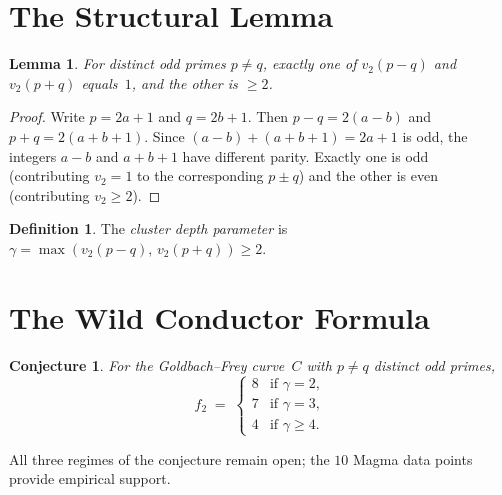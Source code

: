 \documentclass[11pt,a4paper]{article}
\newtheorem{conjecture}[theorem]{Conjecture}
\newtheorem{lemma}[theorem]{Lemma}
\theoremstyle{definition}
\newtheorem{definition}[theorem]{Definition}
\theoremstyle{remark}
\begin{document}
\section{The Structural Lemma}\label{sec:lemma}

\begin{lemma}\label{lem:structure}
  For distinct odd primes $p \ne q$, exactly one of
  $v_2(p - q)$ and $v_2(p + q)$ equals~$1$, and the
  other is $\ge 2$.
\end{lemma}

\begin{proof}
  Write $p = 2a + 1$ and $q = 2b + 1$.  Then
  $p - q = 2(a - b)$ and $p + q = 2(a + b + 1)$.
  Since $(a - b) + (a + b + 1) = 2a + 1$ is odd,
  the integers $a - b$ and $a + b + 1$ have different
  parity.  Exactly one is odd (contributing $v_2 = 1$
  to the corresponding $p \pm q$) and the other is
  even (contributing $v_2 \ge 2$).
\end{proof}

\begin{definition}\label{def:gamma}
  The \emph{cluster depth parameter} is
  $\gamma = \max(v_2(p - q),\, v_2(p + q)) \ge 2$.
\end{definition}


\section{The Wild Conductor Formula}\label{sec:formula}

\begin{conjecture}\label{conj:f2}
  For the Goldbach--Frey curve~$C$ with $p \ne q$
  distinct odd primes,
  \begin{equation}\label{eq:f2}
    f_2 \;=\; \begin{cases}
      8 & \text{if } \gamma = 2, \\
      7 & \text{if } \gamma = 3, \\
      4 & \text{if } \gamma \ge 4.
    \end{cases}
  \end{equation}
\end{conjecture}

\noindent
All three regimes of the conjecture remain open;
the $10$ Magma data points provide empirical support.
\end{document}
